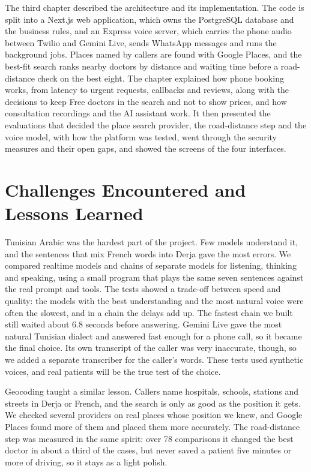 The third chapter described the architecture and its implementation. The code is split into a Next.js web application, which owns the PostgreSQL database and the business rules, and an Express voice server, which carries the phone audio between Twilio and Gemini Live, sends WhatsApp messages and runs the background jobs. Places named by callers are found with Google Places, and the best-fit search ranks nearby doctors by distance and waiting time before a road-distance check on the best eight. The chapter explained how phone booking works, from latency to urgent requests, callbacks and reviews, along with the decisions to keep Free doctors in the search and not to show prices, and how consultation recordings and the AI assistant work. It then presented the evaluations that decided the place search provider, the road-distance step and the voice model, with how the platform was tested, went through the security measures and their open gaps, and showed the screens of the four interfaces.

\section*{Challenges Encountered and Lessons Learned}

Tunisian Arabic was the hardest part of the project. Few models understand it, and the sentences that mix French words into Derja gave the most errors. We compared realtime models and chains of separate models for listening, thinking and speaking, using a small program that plays the same seven sentences against the real prompt and tools. The tests showed a trade-off between speed and quality: the models with the best understanding and the most natural voice were often the slowest, and in a chain the delays add up. The fastest chain we built still waited about 6.8 seconds before answering. Gemini Live gave the most natural Tunisian dialect and answered fast enough for a phone call, so it became the final choice. Its own transcript of the caller was very inaccurate, though, so we added a separate transcriber for the caller's words. These tests used synthetic voices, and real patients will be the true test of the choice.

Geocoding taught a similar lesson. Callers name hospitals, schools, stations and streets in Derja or French, and the search is only as good as the position it gets. We checked several providers on real places whose position we knew, and Google Places found more of them and placed them more accurately. The road-distance step was measured in the same spirit: over 78 comparisons it changed the best doctor in about a third of the cases, but never saved a patient five minutes or more of driving, so it stays as a light polish.

